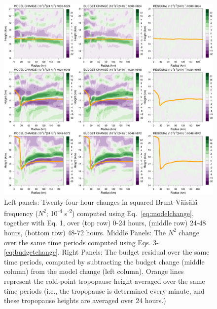 \documentclass{ametsoc}
\begin{document}
\begin{figure}[ht]
\centerline{\includegraphics[width=39pc]{mod+bud+res.png}}
\caption{Left panels: Twenty-four-hour changes in squared Brunt-V{\"a}is{\"a}l{\"a} frequency ($N^2$; 10\textsuperscript{-4} s\textsuperscript{-2}) computed using Eq.~\ref{eq:modelchange}, together with Eq. 1, over (top row) 0-24 hours, (middle row) 24-48 hours, (bottom row) 48-72 hours.
Middle Panels: The $N^2$ change over the same time periods computed using Eqs. 3-\ref{eq:budgetchange}.
Right Panels: The budget residual over the same time periods, computed by subtracting the budget change (middle column) from the model change (left column).
Orange lines represent the cold-point tropopause height averaged over the same time periods (i.e., the tropopause is determined every minute, and these tropopause heights are averaged over 24 hours.)}
\label{fig:mod+bud+res}
\end{figure}
\end{document}
